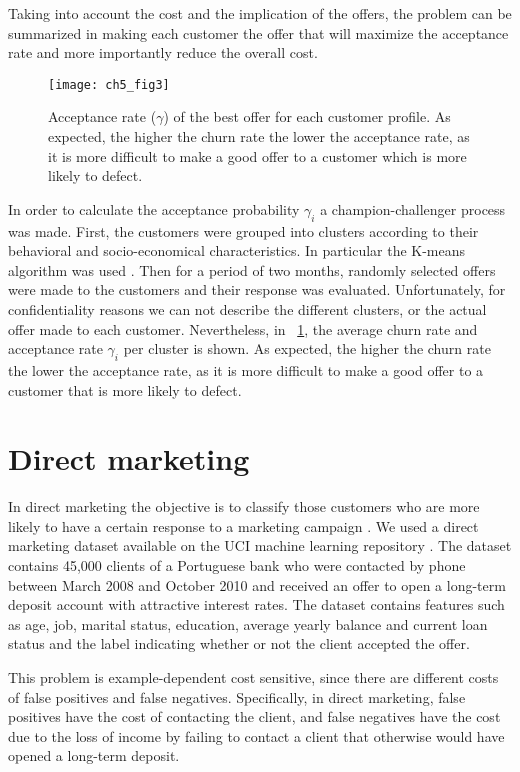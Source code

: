 Taking into account the cost and the implication of the offers, the problem can be 
summarized in making each customer the offer that will maximize the acceptance rate and more 
importantly reduce the overall cost. 

\begin{figure}[t!]
  \centering
   \texttt{[image: ch5\_fig3]}
  \caption{Acceptance rate ($\gamma$) of the best offer for each customer profile. As expected, 
	the higher the churn rate the lower the acceptance rate, as it is more difficult to make a 
	good offer to a customer which is more likely to defect. }
  \label{fig:ch5:3}
\end{figure}

In order to calculate the acceptance probability $\gamma_i$ a champion-challenger process was made. 
First, the customers were grouped into clusters according to their behavioral and socio-economical 
characteristics. In particular the K-means algorithm was used \citep{Marslan2009}.
Then for a period of two months, randomly selected offers were made to the customers and their 
response was evaluated. Unfortunately, for confidentiality reasons we can not describe the 
different clusters, or the actual offer made to each customer. Nevertheless, in 
\figurename{~\ref{fig:ch5:3}}, the average churn rate and acceptance rate $\gamma_i$ per cluster is 
shown. As expected, the higher the churn rate the lower the acceptance rate, as it is more difficult 
to make a good offer to a customer that is more likely to defect.


\section{Direct marketing}
\label{sec:5:directmarketing}

In direct marketing the objective is to classify those customers who are more likely to have a 
certain response to a marketing campaign \citep{Ngai2009}. We used a direct marketing dataset 
\citep{Moro2011} available on the UCI machine learning repository \citep{UCI2013}. The dataset 
contains 45,000 clients of a Portuguese bank who were contacted by phone between March 2008 and 
October 2010 and received an offer to open a long-term deposit account with attractive interest 
rates.  The dataset contains features such as age, job, marital status, education, average yearly 
balance and current loan status and the label indicating whether or not the client accepted 
the offer.

This problem is example-dependent cost sensitive, since there are different costs of false 
positives and false negatives. Specifically, in direct marketing, false positives have the cost 
of contacting the client, and false negatives have the cost due to the loss of income by failing 
to contact a client that otherwise would have opened a long-term deposit. 
  

